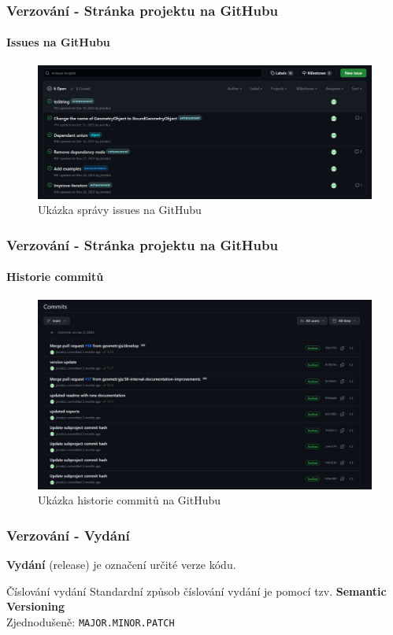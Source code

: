 \begin{frame}
    \frametitle{Verzování - Stránka projektu na GitHubu}
    \framesubtitle{Issues na GitHubu}
    \begin{figure}
        \centering
        \includegraphics[height=0.60\textheight]{../resources/github-issues.png}
        \caption{Ukázka správy issues na GitHubu}
    \end{figure}
\end{frame}

\begin{frame}
    \frametitle{Verzování - Stránka projektu na GitHubu}
    \framesubtitle{Historie commitů}
    \begin{figure}
        \centering
        \includegraphics[height=0.665\textheight]{../resources/github-commits.png}
        \caption{Ukázka historie commitů na GitHubu}
    \end{figure}
\end{frame}


\begin{frame}
    \frametitle{Verzování - Vydání}
    \begin{definition}[Vydání]
        \textbf{Vydání} (release) je označení určité verze kódu.
    \end{definition}

    \begin{block}{Číslování vydání}
        Standardní způsob číslování vydání je pomocí tzv. \textbf{Semantic Versioning}\cite{semantic_versioning:2.0.0} \\
        Zjednodušeně: \texttt{MAJOR.MINOR.PATCH}
    \end{block}
\end{frame}

